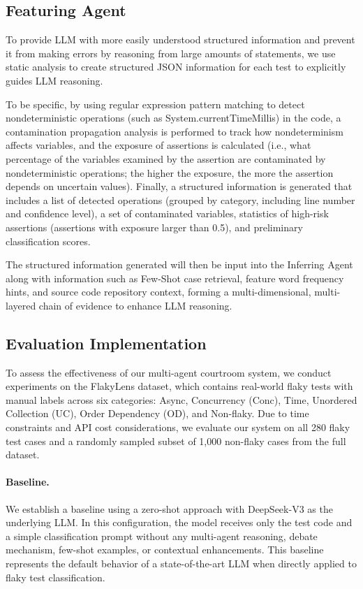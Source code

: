 \documentclass{article}
\begin{document}
\subsection{Featuring Agent}
To provide LLM with more easily understood structured information and prevent it from making errors by reasoning from large amounts of statements, we use static analysis to create structured JSON information for each test to explicitly guides LLM reasoning.

To be specific, by using regular expression pattern matching to detect nondeterministic operations (such as System.currentTimeMillis) in the code, a contamination propagation analysis is performed to track how nondeterminism affects variables, and the exposure of assertions is calculated (i.e., what percentage of the variables examined by the assertion are contaminated by nondeterministic operations; the higher the exposure, the more the assertion depends on uncertain values). Finally, a structured information is generated that includes a list of detected operations (grouped by category, including line number and confidence level), a set of contaminated variables, statistics of high-risk assertions (assertions with exposure larger than 0.5), and preliminary classification scores.

The structured information generated will then be input into the Inferring Agent along with information such as Few-Shot case retrieval, feature word frequency hints, and source code repository context, forming a multi-dimensional, multi-layered chain of evidence to enhance LLM reasoning.

\subsection{Evaluation Implementation}

To assess the effectiveness of our multi-agent courtroom system, we conduct experiments on the FlakyLens dataset, which contains real-world flaky tests with manual labels across six categories: Async, Concurrency (Conc), Time, Unordered Collection (UC), Order Dependency (OD), and Non-flaky. Due to time constraints and API cost considerations, we evaluate our system on all 280 flaky test cases and a randomly sampled subset of 1,000 non-flaky cases from the full dataset.


\paragraph{Baseline.} We establish a baseline using a zero-shot approach with DeepSeek-V3 as the underlying LLM. In this configuration, the model receives only the test code and a simple classification prompt without any multi-agent reasoning, debate mechanism, few-shot examples, or contextual enhancements. This baseline represents the default behavior of a state-of-the-art LLM when directly applied to flaky test classification.
\end{document}
